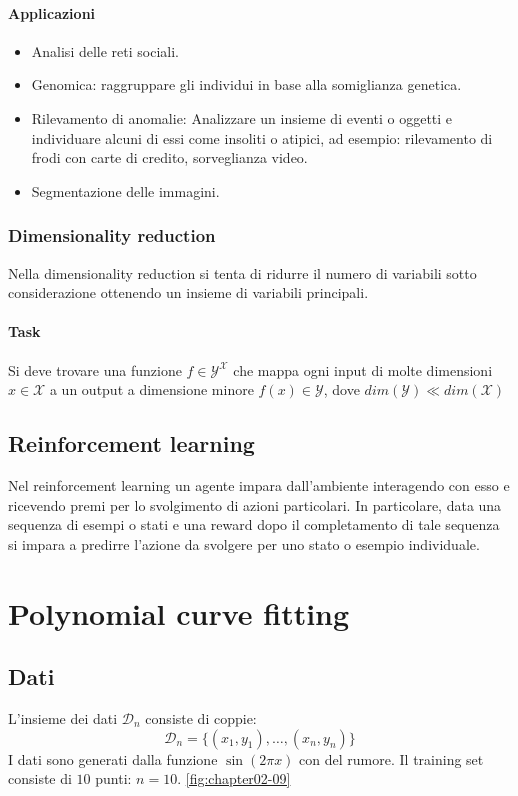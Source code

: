 \paragraph{Applicazioni}
\begin{multicols}{2}
	\begin{itemize}
		\item Analisi delle reti sociali.
		\item Genomica: raggruppare gli individui in base alla somiglianza genetica.
		\item Rilevamento di anomalie: Analizzare un insieme di eventi o oggetti e individuare alcuni di essi come insoliti o atipici, ad esempio: rilevamento di frodi con carte di credito, sorveglianza video.
		\item Segmentazione delle immagini.
	\end{itemize}
\end{multicols}

	\subsubsection{Dimensionality reduction}
	Nella dimensionality reduction si tenta di ridurre il numero di variabili sotto considerazione ottenendo un insieme di variabili principali.

		\paragraph{Task}
		Si deve trovare una funzione $f\in\mathcal{Y}^\mathcal{X}$ che mappa ogni input di molte dimensioni $x\in\mathcal{X}$ a un output a dimensione minore $f(x)\in\mathcal{Y}$, dove $dim(\mathcal{Y})\ll dim(\mathcal{X})$

	\subsection{Reinforcement learning}
	Nel reinforcement learning un agente impara dall'ambiente interagendo con esso e ricevendo premi per lo svolgimento di azioni particolari.
	In particolare, data una sequenza di esempi o stati e una reward dopo il completamento di tale sequenza si impara a predirre l'azione da svolgere per uno stato o esempio individuale.

\section{Polynomial curve fitting}

	\subsection{Dati}
	L'insieme dei dati $\mathcal{D}_n$ consiste di coppie:
	$$\mathcal{D}_n = \{(x_1, y_1),\dots,(x_n,y_n)\}$$
	I dati sono generati dalla funzione $\sin(2\pi x)$ con del rumore.
	Il training set consiste di $10$ punti: $n = 10$. \ref{fig:chapter02-09}

